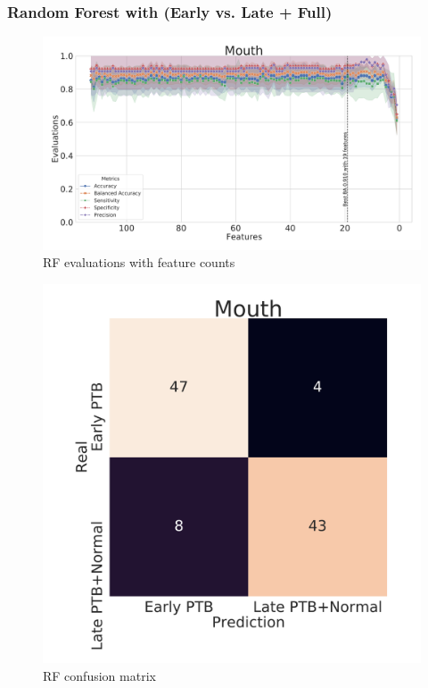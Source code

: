 \documentclass{beamer}
\begin{document}
    \begin{frame}[allowframebreaks]
        \frametitle{Random Forest with (Early vs. Late + Full)}

        \begin{figure}
            \includegraphics[width=0.8 \linewidth]{figures/RandomForest/RF-two.DADA2.homd.uncorrected/Mouth+metrics.pdf}
            \caption{RF evaluations with feature counts}
        \end{figure}

        \begin{figure}
            \includegraphics[width=0.5 \linewidth]{figures/RandomForest/RF-two.DADA2.homd.uncorrected/Mouth+heatmap.pdf}
            \caption{RF confusion matrix}
        \end{figure}


\end{frame}
\end{document}

